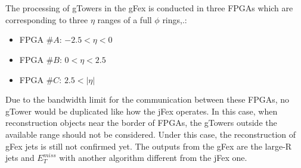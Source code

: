 \noindent
\\
\\The processing of gTowers in the gFex is conducted in three FPGAs which are corresponding to three $\eta$ ranges of a full $\phi$ rings,.:
\begin{itemize}
	\item FPGA $\#A$: $-2.5<\eta<0$
	\item FPGA $\#B$: $0<\eta<2.5$
	\item FPGA $\#C$: $2.5<|\eta|$
\end{itemize}
Due to the bandwidth limit for the communication between these FPGAs, no gTower would be duplicated like how the jFex operates. In this case, when reconstruction objects near the border of FPGAs, the gTowers outside the available range should not be considered. Under this case, the reconstruction of gFex jets is still not confirmed yet. The outputs from the gFex are the large-R jets and $E^{miss}_{T}$ with another algorithm different from the jFex one.
